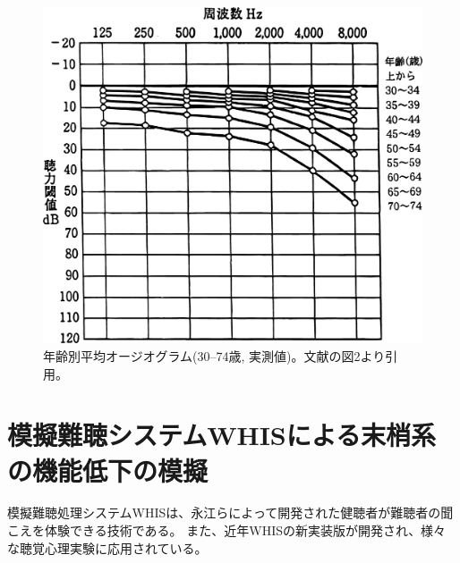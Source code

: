 \begin{figure}[h]
    \centering
    \includegraphics[width=0.6\hsize]{Figure/RelatedResearch/Tsuiki2003Audiogram.eps}
    \caption{年齢別平均オージオグラム(30--74歳, 実測値)。文献\cite{tuiki2003eldery}の図2より引用。}
    \label{fig:Audiogram}
\end{figure}



\section{模擬難聴システムWHISによる末梢系の機能低下の模擬 \cite{irino2022moginancho,irino2023hearing}}
\label{sec:WHIS}

模擬難聴処理システムWHISは、永江らによって開発された健聴者が難聴者の聞こえを体験できる技術である\cite{nagae2016WHIS}。
また、近年WHISの新実装版が開発され\cite{irino2023hearing}、様々な聴覚心理実験に応用されている。


